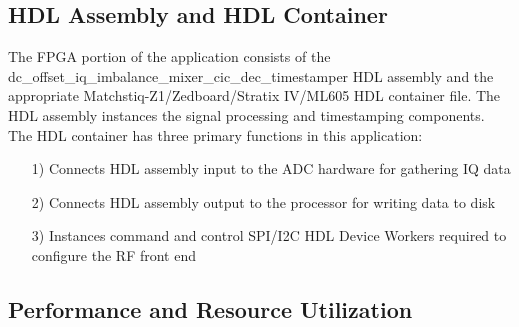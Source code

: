 \subsection{HDL Assembly and HDL Container}
The FPGA portion of the application consists of the dc\_offset\_iq\_imbalance\_mixer\_cic\_dec\_timestamper HDL assembly and the appropriate  Matchstiq-Z1/Zedboard/Stratix IV/ML605 HDL container file. The HDL assembly instances the signal processing and timestamping components. The HDL container has three primary functions in this application:
\begin{itemize}
	\item[1)] Connects HDL assembly input to the ADC hardware for gathering IQ data
	\item[2)] Connects HDL assembly output to the processor for writing data to disk
	\item[3)] Instances command and control SPI/I2C HDL Device Workers required to configure the RF front end
\end{itemize}
\begin{landscape}
\subsection{Performance and Resource Utilization}
%
\end{landscape}

